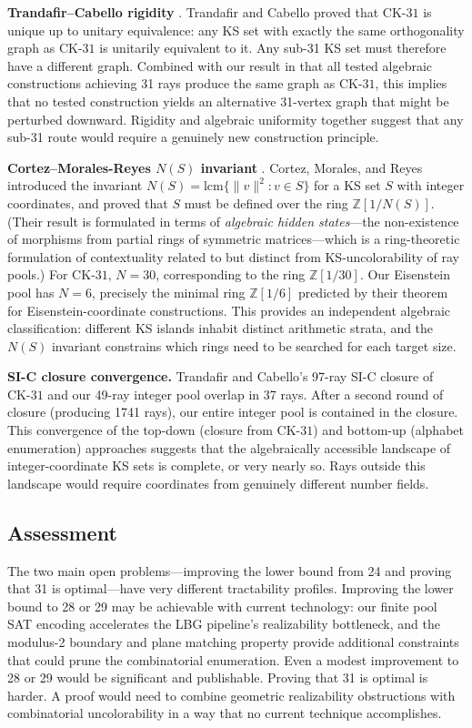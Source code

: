 \documentclass[twocolumn,pra,superscriptaddress,nofootinbib]{revtex4-2}
\newcommand{\Z}{\mathbb{Z}}
\newcommand{\CK}{\mathrm{CK\text{-}31}}
\begin{document}
\textbf{Trandafir--Cabello rigidity} \cite{TrandafirCabello2025}.
Trandafir and Cabello proved that $\CK$ is unique up to unitary equivalence:
any KS set with exactly the same orthogonality graph as $\CK$ is unitarily
equivalent to it. Any sub-31 KS set must therefore have a different graph.
Combined with our result in \cite{Kernaghan2026algebraic} that all tested
algebraic constructions achieving 31 rays produce the same graph as $\CK$, this
implies that no tested construction yields an alternative 31-vertex graph that
might be perturbed downward. Rigidity and algebraic uniformity together suggest
that any sub-31 route would require a genuinely new construction principle.

\textbf{Cortez--Morales-Reyes $N(S)$ invariant} \cite{CortezMoralesReyes2022}.
Cortez, Morales, and Reyes introduced the invariant $N(S) = \mathrm{lcm}\{\|v\|^2
: v \in S\}$ for a KS set $S$ with integer coordinates, and proved that $S$
must be defined over the ring $\Z[1/N(S)]$. (Their result is formulated in
terms of \emph{algebraic hidden states}---the non-existence of morphisms from
partial rings of symmetric matrices---which is a ring-theoretic formulation
of contextuality related to but distinct from KS-uncolorability of ray pools.) For $\CK$, $N = 30$, corresponding
to the ring $\Z[1/30]$. Our Eisenstein pool has $N = 6$, precisely the minimal
ring $\Z[1/6]$ predicted by their theorem for Eisenstein-coordinate
constructions. This provides an independent algebraic classification: different
KS islands inhabit distinct arithmetic strata, and the $N(S)$ invariant
constrains which rings need to be searched for each target size.

\textbf{SI-C closure convergence.}
Trandafir and Cabello's 97-ray SI-C closure of $\CK$ \cite{TrandafirCabello2025}
and our 49-ray integer pool overlap in 37 rays. After a second round of closure
(producing 1741 rays), our entire integer pool is contained in the closure.
This convergence of the top-down (closure from $\CK$) and bottom-up (alphabet
enumeration) approaches suggests that the algebraically accessible landscape
of integer-coordinate KS sets is complete, or very nearly so. Rays outside this
landscape would require coordinates from genuinely different number fields.

\subsection{Assessment}

The two main open problems---improving the lower bound from 24 and proving that
31 is optimal---have very different tractability profiles. Improving the lower
bound to 28 or 29 may be achievable with current technology: our finite pool
SAT encoding accelerates the LBG pipeline's realizability bottleneck, and the
modulus-2 boundary and plane matching property provide additional constraints
that could prune the combinatorial enumeration. Even a modest improvement to 28
or 29 would be significant and publishable. Proving that 31 is optimal is harder.
A proof would need to combine geometric realizability obstructions with
combinatorial uncolorability in a way that no current technique accomplishes.
\end{document}
